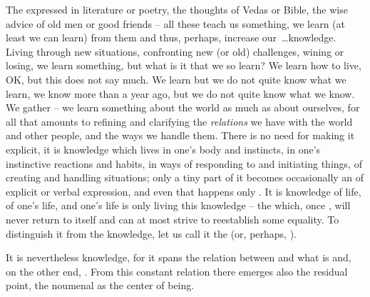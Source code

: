 The  expressed in literature or poetry, the thoughts of Vedas
or Bible, the wise advice of old men or good friends -- all these teach us
something, we learn (at least we can learn) from them and thus, perhaps,
increase our~\ldots knowledge. Living through new situations, confronting new (or
old) challenges, wining or losing, we learn something, but what is it that we so
learn? We learn how to live, OK, but this does not say much. We learn but we do
not quite know what we learn, we know more than a year ago, but we do not quite
know what we know. We gather  -- we learn something about
the world as much as about ourselves, for all that amounts to refining and
clarifying the {\em relations} we have with the world and other people, and the
ways we handle them.  There is no need for making it explicit, it is knowledge
which lives in one's body and instincts, in one's instinctive reactions and habits,
in ways of responding to and initiating things,  of creating
and handling situations; only a tiny part of it becomes occasionally an
 of explicit  or verbal expression, and even that
happens only .  It is knowledge of life, of one's life, and
one's life is only living this knowledge -- the 
which, once , will never return to itself and can at most strive
to reestablish some equality. To distinguish it from the
 knowledge, let us call it the  (or, perhaps,
). 

It is nevertheless knowledge, for it spans the relation between  and what
is  and, on the other end, . From this constant relation
there emerges also the residual point, the noumenal  as the center of
 being.

